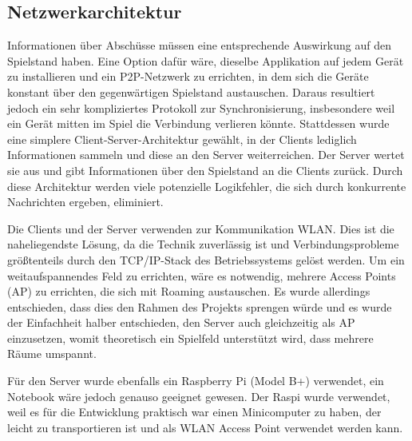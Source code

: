 \subsection{Netzwerkarchitektur}
Informationen über Abschüsse müssen eine entsprechende Auswirkung auf den Spielstand haben.
Eine Option dafür wäre, dieselbe Applikation auf jedem Gerät zu installieren und ein P2P-Netzwerk zu
errichten, in dem sich die Geräte konstant über den gegenwärtigen Spielstand austauschen.
Daraus resultiert jedoch ein sehr kompliziertes Protokoll zur Synchronisierung, insbesondere weil
ein Gerät mitten im Spiel die Verbindung verlieren könnte.
Stattdessen wurde eine simplere Client-Server-Architektur gewählt, in der Clients lediglich
Informationen sammeln und diese an den Server weiterreichen.
Der Server wertet sie aus und gibt Informationen über den Spielstand an die Clients zurück.
Durch diese Architektur werden viele potenzielle Logikfehler, die sich durch konkurrente Nachrichten
ergeben, eliminiert.

Die Clients und der Server verwenden zur Kommunikation WLAN. Dies ist die naheliegendste Lösung, da
die Technik zuverlässig ist und Verbindungsprobleme größtenteils durch den TCP/IP-Stack des
Betriebssystems gelöst werden.
Um ein weitaufspannendes Feld zu errichten, wäre es notwendig, mehrere Access Points (AP) zu
errichten, die sich mit Roaming austauschen.
Es wurde allerdings entschieden, dass dies den Rahmen des Projekts sprengen würde und es wurde der
Einfachheit halber entschieden, den Server auch gleichzeitig als AP einzusetzen, womit theoretisch
ein Spielfeld unterstützt wird, dass mehrere Räume umspannt.

Für den Server wurde ebenfalls ein Raspberry Pi (Model B+) verwendet, ein Notebook wäre jedoch
genauso geeignet gewesen.
Der Raspi wurde verwendet, weil es für die Entwicklung praktisch war einen Minicomputer zu haben,
der leicht zu transportieren ist und als WLAN Access Point verwendet werden kann.
